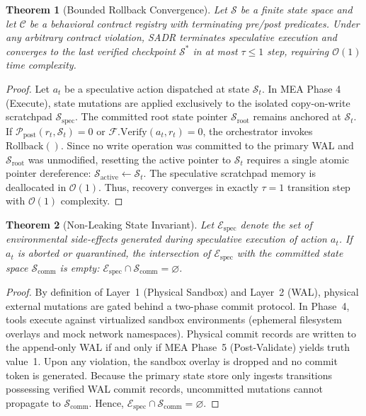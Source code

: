 \documentclass[10pt,journal,compsoc]{IEEEtran}
\newtheorem{theorem}{Theorem}
\begin{document}
\begin{theorem}[Bounded Rollback Convergence]
Let $\mathcal{S}$ be a finite state space and let $\mathcal{C}$ be a behavioral contract registry with terminating pre/post predicates. Under any arbitrary contract violation, SADR terminates speculative execution and converges to the last verified checkpoint $\mathcal{S}^*$ in at most $\tau \le 1$ step, requiring $\mathcal{O}(1)$ time complexity.
\end{theorem}

\begin{proof}
Let $a_t$ be a speculative action dispatched at state $\mathcal{S}_t$. In MEA Phase 4 (Execute), state mutations are applied exclusively to the isolated copy-on-write scratchpad $\mathcal{S}_{\text{spec}}$. The committed root state pointer $\mathcal{S}_{\text{root}}$ remains anchored at $\mathcal{S}_t$. If $\mathcal{P}_{\text{post}}(r_t, \mathcal{S}_t) = 0$ or $\mathcal{F}.\text{Verify}(a_t, r_t) = 0$, the orchestrator invokes $\text{Rollback}()$. Since no write operation was committed to the primary WAL and $\mathcal{S}_{\text{root}}$ was unmodified, resetting the active pointer to $\mathcal{S}_t$ requires a single atomic pointer dereference: $\mathcal{S}_{\text{active}} \gets \mathcal{S}_t$. The speculative scratchpad memory is deallocated in $\mathcal{O}(1)$. Thus, recovery converges in exactly $\tau = 1$ transition step with $\mathcal{O}(1)$ complexity.
\end{proof}

\begin{theorem}[Non-Leaking State Invariant]
Let $\mathcal{E}_{\text{spec}}$ denote the set of environmental side-effects generated during speculative execution of action $a_t$. If $a_t$ is aborted or quarantined, the intersection of $\mathcal{E}_{\text{spec}}$ with the committed state space $\mathcal{S}_{\text{comm}}$ is empty: $\mathcal{E}_{\text{spec}} \cap \mathcal{S}_{\text{comm}} = \varnothing$.
\end{theorem}

\begin{proof}
By definition of Layer~1 (Physical Sandbox) and Layer~2 (WAL), physical external mutations are gated behind a two-phase commit protocol. In Phase~4, tools execute against virtualized sandbox environments (ephemeral filesystem overlays and mock network namespaces). Physical commit records are written to the append-only WAL if and only if MEA Phase~5 (Post-Validate) yields truth value~1. Upon any violation, the sandbox overlay is dropped and no commit token is generated. Because the primary state store only ingests transitions possessing verified WAL commit records, uncommitted mutations cannot propagate to $\mathcal{S}_{\text{comm}}$. Hence, $\mathcal{E}_{\text{spec}} \cap \mathcal{S}_{\text{comm}} = \varnothing$.
\end{proof}
\end{document}
